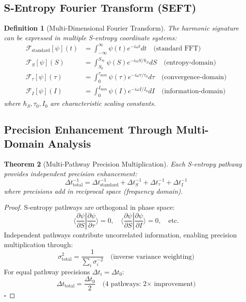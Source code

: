 \documentclass[12pt,a4paper]{article}
\newtheorem{theorem}{Theorem}[section]
\newtheorem{definition}[theorem]{Definition}
\begin{document}
\subsection{S-Entropy Fourier Transform (SEFT)}

\begin{definition}[Multi-Dimensional Fourier Transform]
The harmonic signature can be expressed in multiple S-entropy coordinate systems:
\begin{align}
\mathcal{F}_{\text{standard}}[\psi](t) &= \int_{-\infty}^{\infty} \psi(t) e^{-i\omega t} dt \quad \text{(standard FFT)} \\
\mathcal{F}_{S}[\psi](S) &= \int_{S_0}^{S_{\infty}} \psi(S) e^{-i\omega S/\hbar_S} dS \quad \text{(entropy-domain)} \\
\mathcal{F}_{\tau}[\psi](\tau) &= \int_0^{\tau_{\text{max}}} \psi(\tau) e^{-i\omega \tau/\tau_0} d\tau \quad \text{(convergence-domain)} \\
\mathcal{F}_{I}[\psi](I) &= \int_0^{I_{\text{max}}} \psi(I) e^{-i\omega I/I_0} dI \quad \text{(information-domain)}
\end{align}
where $\hbar_S, \tau_0, I_0$ are characteristic scaling constants.
\end{definition}

\subsection{Precision Enhancement Through Multi-Domain Analysis}

\begin{theorem}[Multi-Pathway Precision Multiplication]
Each S-entropy pathway provides independent precision enhancement:
\begin{equation}
\Delta t_{\text{total}}^{-1} = \Delta t_{\text{standard}}^{-1} + \Delta t_{S}^{-1} + \Delta t_{\tau}^{-1} + \Delta t_{I}^{-1}
\end{equation}
where precisions add in reciprocal space (frequency domain).
\end{theorem}

\begin{proof}
S-entropy pathways are orthogonal in phase space:
\begin{equation}
\langle \frac{\partial \psi}{\partial S} | \frac{\partial \psi}{\partial \tau} \rangle = 0, \quad \langle \frac{\partial \psi}{\partial S} | \frac{\partial \psi}{\partial I} \rangle = 0, \quad \text{etc.}
\end{equation}
Independent pathways contribute uncorrelated information, enabling precision multiplication through:
\begin{equation}
\sigma_{\text{total}}^2 = \frac{1}{\sum_{i} \sigma_i^{-2}} \quad \text{(inverse variance weighting)}
\end{equation}
For equal pathway precisions $\Delta t_i = \Delta t_0$:
\begin{equation}
\Delta t_{\text{total}} = \frac{\Delta t_0}{2} \quad \text{(4 pathways: 2× improvement)}
\end{equation}
$\square$
\end{proof}
\end{document}
